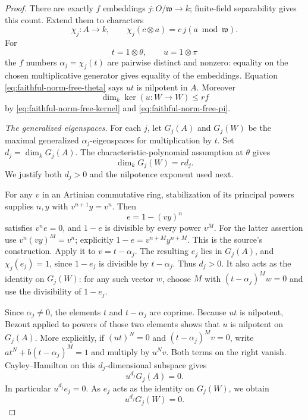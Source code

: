 \begin{proof}
There are exactly \(f\) embeddings
\(j:O/\mathfrak w\to k\); finite-field separability gives this
count.  Extend them to characters
\[
 \chi_j:A\to k,\qquad
                  \chi_j(c\otimes a)=c\,j(a\bmod\mathfrak w).
\]
For
\[
                 t=1\otimes\theta,\qquad u=1\otimes\pi
\]
the \(f\) numbers \(\alpha_j=\chi_j(t)\) are pairwise distinct
and nonzero: equality on the chosen multiplicative generator
gives equality of the embeddings.
Equation \eqref{eq:faithful-norm-free-theta} says \(ut\) is
nilpotent in \(A\).  Moreover
\[
 \dim_k\ker(u:W\to W)\le rf
 \tag{NF7}\label{eq:faithful-norm-free-total-kernel}
\]
by \eqref{eq:faithful-norm-free-kernel} and
\eqref{eq:faithful-norm-free-pi}.

\emph{The generalized eigenspaces.}
For each \(j\), let \(G_j(A)\) and \(G_j(W)\) be the maximal
generalized \(\alpha_j\)-eigenspaces for multiplication by \(t\).
Set \(d_j=\dim_kG_j(A)\).
The characteristic-polynomial assumption at \(\theta\) gives
\[
                      \dim_kG_j(W)=r d_j .
 \tag{NF8}\label{eq:faithful-norm-free-eigenspace-size}
\]
We justify both \(d_j>0\) and the nilpotence exponent used next.

For any \(v\) in an Artinian commutative ring, stabilization of
its principal powers supplies \(n,y\) with
\(v^{n+1}y=v^n\).
Then
\[
             e=1-(vy)^n
\]
satisfies \(v^ne=0\), and \(1-e\) is divisible by every power
\(v^M\).  For the latter assertion use
\(v^n(vy)^M=v^n\); explicitly
\(1-e=v^{n+M}y^{n+M}\).
This is the source's  construction.
Apply it to \(v=t-\alpha_j\).
The resulting \(e_j\) lies in \(G_j(A)\), and
\(\chi_j(e_j)=1\), since \(1-e_j\) is divisible by \(t-\alpha_j\).
Thus \(d_j>0\).
It also acts as the identity on \(G_j(W)\):
for any such vector \(w\), choose \(M\) with
\((t-\alpha_j)^Mw=0\) and use the divisibility of \(1-e_j\).

Since \(\alpha_j\ne0\), the elements \(t\) and \(t-\alpha_j\)
are coprime.  Because \(ut\) is nilpotent, Bezout applied to
powers of those two elements shows that \(u\) is nilpotent
on \(G_j(A)\).  More explicitly, if \((ut)^N=0\) and
\((t-\alpha_j)^Mv=0\), write
\(a t^N+b(t-\alpha_j)^M=1\) and multiply by \(u^Nv\).
Both terms on the right vanish.
Cayley--Hamilton on this \(d_j\)-dimensional subspace gives
\[
                          u^{d_j}G_j(A)=0 .
\]
In particular \(u^{d_j}e_j=0\).
As \(e_j\) acts as the identity on \(G_j(W)\), we obtain
\[
                          u^{d_j}G_j(W)=0 .
 \tag{NF9}\label{eq:faithful-norm-free-nilpotence}
\]


\end{proof}
